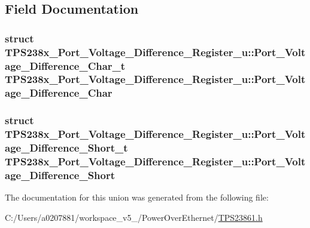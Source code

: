 \subsection{Field Documentation}
\hypertarget{union_t_p_s238x___port___voltage___difference___register__u_a6ca90ba515558aff081e7c93770dea92}{
\subsubsection[{Port\-\_\-\-Voltage\-\_\-\-Difference\-\_\-\-Char}]{\setlength{\rightskip}{0pt plus 5cm}struct {\bf T\-P\-S238x\-\_\-\-Port\-\_\-\-Voltage\-\_\-\-Difference\-\_\-\-Register\-\_\-u\-::\-Port\-\_\-\-Voltage\-\_\-\-Difference\-\_\-\-Char\-\_\-t}  T\-P\-S238x\-\_\-\-Port\-\_\-\-Voltage\-\_\-\-Difference\-\_\-\-Register\-\_\-u\-::\-Port\-\_\-\-Voltage\-\_\-\-Difference\-\_\-\-Char}}\label{union_t_p_s238x___port___voltage___difference___register__u_a6ca90ba515558aff081e7c93770dea92}
\hypertarget{union_t_p_s238x___port___voltage___difference___register__u_ab8b9788778b3d05be0fe374834e40395}{
\subsubsection[{Port\-\_\-\-Voltage\-\_\-\-Difference\-\_\-\-Short}]{\setlength{\rightskip}{0pt plus 5cm}struct {\bf T\-P\-S238x\-\_\-\-Port\-\_\-\-Voltage\-\_\-\-Difference\-\_\-\-Register\-\_\-u\-::\-Port\-\_\-\-Voltage\-\_\-\-Difference\-\_\-\-Short\-\_\-t}  T\-P\-S238x\-\_\-\-Port\-\_\-\-Voltage\-\_\-\-Difference\-\_\-\-Register\-\_\-u\-::\-Port\-\_\-\-Voltage\-\_\-\-Difference\-\_\-\-Short}}\label{union_t_p_s238x___port___voltage___difference___register__u_ab8b9788778b3d05be0fe374834e40395}


The documentation for this union was generated from the following file\-:\begin{DoxyCompactItemize}
\item 
C\-:/\-Users/a0207881/workspace\-\_\-v5\-\_/\-Power\-Over\-Ethernet/\hyperlink{_t_p_s23861_8h}{T\-P\-S23861.\-h}\end{DoxyCompactItemize}
